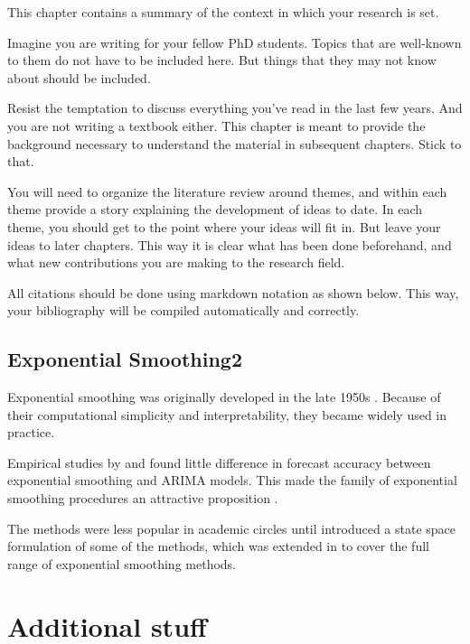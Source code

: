 \documentclass{sydneythesis}
\begin{document}
This chapter contains a summary of the context in which your research is set.

Imagine you are writing for your fellow PhD students. Topics that are well-known to them do not have to be included here. But things that they may not know about should be included.

Resist the temptation to discuss everything you've read in the last few years. And you are not writing a textbook either. This chapter is meant to provide the background necessary to understand the material in subsequent chapters. Stick to that.

You will need to organize the literature review around themes, and within each theme provide a story explaining the development of ideas to date. In each theme, you should get to the point where your ideas will fit in. But leave your ideas to later chapters. This way it is clear what has been done beforehand, and what new contributions you are making to the research field.

All citations should be done using markdown notation as shown below. This way, your bibliography will be compiled automatically and correctly.

\hypertarget{sec:expsmooth2}{%
\section{Exponential Smoothing2}\label{sec:expsmooth2}}

Exponential smoothing was originally developed in the late 1950s \autocite{Brown59,Brown63,Holt57,Winters60}. Because of their computational simplicity and interpretability, they became widely used in practice.

Empirical studies by \textcite{MH79} and \textcite{Metal82} found little difference in forecast accuracy between exponential smoothing and ARIMA models. This made the family of exponential smoothing procedures an attractive proposition \autocite[see][]{CKOS01}.

The methods were less popular in academic circles until \textcite{OKS97} introduced a state space formulation of some of the methods, which was extended in \textcite{HKSG02} to cover the full range of exponential smoothing methods.

\appendix

\hypertarget{additional-stuff}{%
\chapter{Additional stuff}\label{additional-stuff}}
\end{document}
